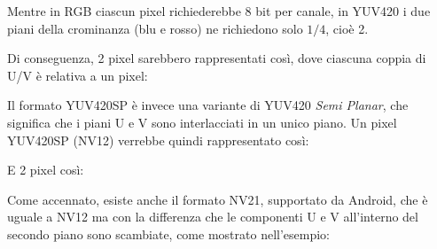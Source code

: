 \begin{figure}[H]
\end{figure}

Mentre in RGB ciascun pixel richiederebbe 8 bit per canale, in YUV420 i due piani della crominanza (blu e rosso) ne richiedono solo $1/4$, cioè 2.

Di conseguenza, 2 pixel sarebbero rappresentati così, dove ciascuna coppia di U/V è relativa a un pixel:

\begin{figure}[H]
\end{figure}

Il formato YUV420SP è invece una variante di YUV420 \emph{Semi Planar}, che significa che i piani U e V sono interlacciati in un unico piano. Un pixel YUV420SP (NV12) verrebbe quindi rappresentato così:

\begin{figure}[H]
\end{figure}

E 2 pixel così:

\begin{figure}[H]
\end{figure}

Come accennato, esiste anche il formato NV21, supportato da Android, che è uguale a NV12 ma con la differenza che le componenti U e V all'interno del secondo piano sono scambiate, come mostrato nell'esempio:

\begin{figure}[H]
\end{figure}

